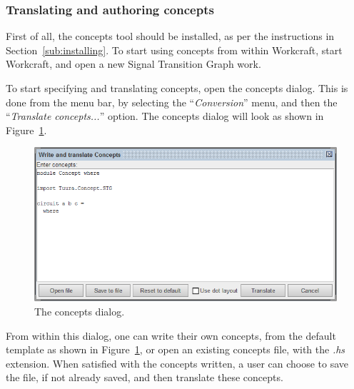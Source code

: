 \documentclass[british,conference,compsoc]{IEEEtran}
\begin{document}
\vspace{-2mm}
 
\subsubsection{Translating and authoring concepts}

First of all, the concepts tool should be installed, as per the instructions in
Section~\ref{sub:installing}. To start using concepts from within Workcraft, 
start Workcraft, and open a new Signal Transition Graph work. 

To start specifying and translating concepts, open the concepts dialog.  This is
done from the menu bar, by selecting the ``\emph{Conversion}'' menu, and then
the ``\emph{Translate concepts...}'' option. The concepts dialog will look as 
shown in Figure~\ref{fig:concepts_dialog_screenshot}.

\vspace{-3mm}

\begin{figure}[h]
\begin{centering}
\includegraphics[scale=0.45]{Images/concepts_dialog_screenshot.png}
\par\end{centering}

\begin{centering}
\protect\caption{\label{fig:concepts_dialog_screenshot}The concepts dialog.}

\par\end{centering}
\vspace{-4mm}
\end{figure}

\vspace{-3mm}

From within this dialog, one can write their own concepts, from the default 
template as shown in Figure~\ref{fig:concepts_dialog_screenshot}, or open an 
existing concepts file, with the \emph{.hs} extension. When satisfied with the 
concepts written, a user can choose to save the file, if not already saved, and
then translate these concepts.
\end{document}
